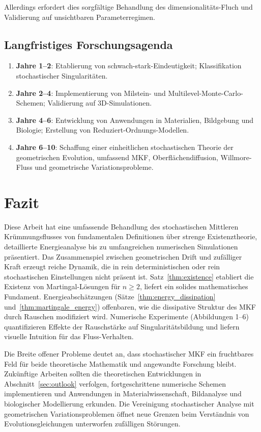 \documentclass[a4paper,12pt]{article}
\theoremstyle{definition}
\begin{document}
Allerdings erfordert dies sorgfältige Behandlung des dimensionalitäts-Fluch und Validierung auf unsichtbaren Parameterregimen.

\subsection{Langfristiges Forschungsagenda}

\begin{enumerate}
	\item \textbf{Jahre 1--2}: Etablierung von schwach-stark-Eindeutigkeit; Klassifikation stochastischer Singularitäten.
	\item \textbf{Jahre 2--4}: Implementierung von Milstein- und Multilevel-Monte-Carlo-Schemen; Validierung auf 3D-Simulationen.
	\item \textbf{Jahre 4--6}: Entwicklung von Anwendungen in Materialien, Bildgebung und Biologie; Erstellung von Reduziert-Ordnungs-Modellen.
	\item \textbf{Jahre 6--10}: Schaffung einer einheitlichen stochastischen Theorie der geometrischen Evolution, umfassend MKF, Oberflächendiffusion, Willmore-Fluss und geometrische Variationsprobleme.
\end{enumerate}

\section{Fazit}

Diese Arbeit hat eine umfassende Behandlung des stochastischen Mittleren Krümmungsflusses von fundamentalen Definitionen über strenge Existenztheorie, detaillierte Energieanalyse bis zu umfangreichen numerischen Simulationen präsentiert. Das Zusammenspiel zwischen geometrischen Drift und zufälliger Kraft erzeugt reiche Dynamik, die in rein deterministischen oder rein stochastischen Einstellungen nicht präsent ist. Satz~\ref{thm:existence} etabliert die Existenz von Martingal-Lösungen für $n \geq 2$, liefert ein solides mathematisches Fundament. Energieabschätzungen (Sätze~\ref{thm:energy_dissipation} und~\ref{thm:martingale_energy}) offenbaren, wie die dissipative Struktur des MKF durch Rauschen modifiziert wird. Numerische Experimente (Abbildungen 1--6) quantifizieren Effekte der Rauschstärke auf Singularitätsbildung und liefern visuelle Intuition für das Fluss-Verhalten.

Die Breite offener Probleme deutet an, dass stochastischer MKF ein fruchtbares Feld für beide theoretische Mathematik und angewandte Forschung bleibt. Zukünftige Arbeiten sollten die theoretischen Entwicklungen in Abschnitt~\ref{sec:outlook} verfolgen, fortgeschrittene numerische Schemen implementieren und Anwendungen in Materialwissenschaft, Bildanalyse und biologischer Modellierung erkunden. Die Vereinigung stochastischer Analyse mit geometrischen Variationsproblemen öffnet neue Grenzen beim Verständnis von Evolutionsgleichungen unterworfen zufälligen Störungen.
\end{document}
